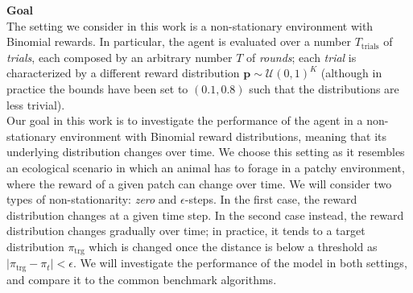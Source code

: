 \hfill \break
\textbf{Goal} \\
\noindent The setting we consider in this work is a non-stationary environment with Binomial rewards. In particular, the agent is evaluated over a number $T_{\text{trials}}$ of \textit{trials}, each composed by an arbitrary number $T$ of \textit{rounds}; each \textit{trial} is characterized by a different
reward distribution $\mathbf{p}\sim\mathcal{U}(0,1)^{K}$ (although in practice the bounds have been set to $(0.1, 0.8)$ such that the distributions are less trivial). \\
\noindent Our goal in this work is to investigate the performance of the agent in a non-stationary environment with Binomial reward distributions, meaning that its underlying distribution changes over time. We choose this setting as it resembles an ecological scenario in which an animal has to forage in a patchy environment, where the reward of a given patch can change over time.
We will consider two types of non-stationarity: \textit{zero} and $\epsilon$-steps. In the first case, the reward distribution changes at a given time step. In the second case instead, the reward distribution changes gradually over time; in practice, it tends to a target distribution
$\pi_{\text{trg}}$ which is changed once the distance is below a threshold as $\vert \pi_{\text{trg}} - \pi_{t}\vert < \epsilon$.
We will investigate the performance of the model in both settings, and compare it to the common benchmark algorithms.



